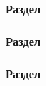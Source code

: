 \begin{frame}[t]
\frametitle{Раздел}

\end{frame}
\begin{frame}[t]
    \frametitle{Раздел}
\end{frame}
\begin{frame}[t]
    \frametitle{Раздел}
\end{frame}
